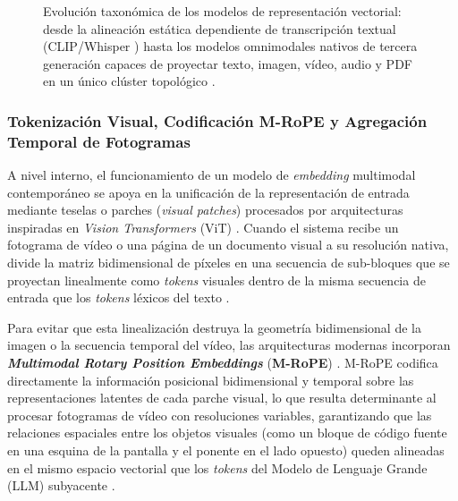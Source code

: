 \begin{figure}[htbp]
\caption{Evolución taxonómica de los modelos de representación vectorial: desde la alineación estática dependiente de transcripción textual (CLIP/Whisper \cite{radford2021clip, radford2023whisper}) hasta los modelos omnimodales nativos de tercera generación capaces de proyectar texto, imagen, vídeo, audio y PDF en un único clúster topológico \cite{prajwal2025multimodal, gemini_emb2_docs, qwen3_vl_emb2026}.}
\label{fig:evolucion_generaciones_embeddings}
\end{figure}

\subsubsection{Tokenización Visual, Codificación M-RoPE y Agregación Temporal de Fotogramas}
\label{subsubsec:tokenizacion_mrope_agregacion}

A nivel interno, el funcionamiento de un modelo de \textit{embedding} multimodal contemporáneo se apoya en la unificación de la representación de entrada mediante teselas o parches (\textit{visual patches}) procesados por arquitecturas inspiradas en \textit{Vision Transformers} (ViT) \cite{prajwal2025multimodal}. Cuando el sistema recibe un fotograma de vídeo o una página de un documento visual a su resolución nativa, divide la matriz bidimensional de píxeles en una secuencia de sub-bloques que se proyectan linealmente como \textit{tokens} visuales dentro de la misma secuencia de entrada que los \textit{tokens} léxicos del texto \cite{prajwal2025multimodal}.

Para evitar que esta linealización destruya la geometría bidimensional de la imagen o la secuencia temporal del vídeo, las arquitecturas modernas incorporan \textbf{\textit{Multimodal Rotary Position Embeddings}} (\textbf{M-RoPE}) \cite{prajwal2025multimodal}. M-RoPE codifica directamente la información posicional bidimensional y temporal sobre las representaciones latentes de cada parche visual, lo que resulta determinante al procesar fotogramas de vídeo con resoluciones variables, garantizando que las relaciones espaciales entre los objetos visuales (como un bloque de código fuente en una esquina de la pantalla y el ponente en el lado opuesto) queden alineadas en el mismo espacio vectorial que los \textit{tokens} del Modelo de Lenguaje Grande (LLM) subyacente \cite{prajwal2025multimodal}.

